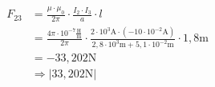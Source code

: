 \begin{enumerate}
    \begin{align*}
      F_{23}&=\frac{\mu\cdot\mu_{0}}{2\pi}\cdot\frac{I_{2}\cdot I_{3}}{a}\cdot l\\
        &=\frac{4\pi\cdot 10^{-7}\frac{\text{H}}{\text{m}}}{2\pi}\cdot\frac{2\cdot 10^{3}\text{A}\cdot(-10\cdot 10^{-2}\text{A})}{2,8\cdot 10^{3}\text{m}+5,1\cdot 10^{-2}\text{m}}\cdot 1,8\text{m}\\
        &=-33,202\text{N}\\
        &\Rightarrow |33,202\text{N}|\\
      \end{align*}
  
  
\end{enumerate}
